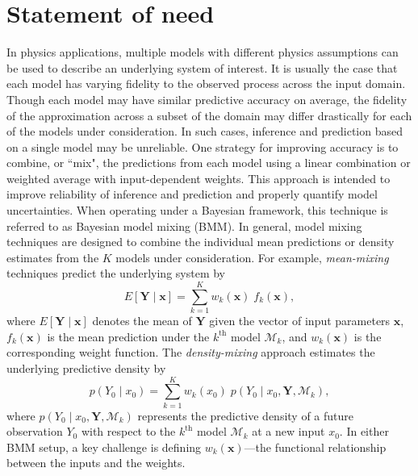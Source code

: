\documentclass[10pt, preprint,aps,prc,floatfix,
tightenlines,
nofootinbib,superscriptaddress]{revtex4-2}
\newcommand{\M}{\mathcal{M}}
\newcommand{\xvec}{\boldsymbol x}
\begin{document}
\section{Statement of need}

In physics applications, multiple models with different physics assumptions can be used to describe an underlying system of interest. It is usually the case that each model has varying fidelity to the observed process across the input domain. Though each model may have similar predictive accuracy on average, the fidelity of the approximation across a subset of the domain may differ drastically for each of the models under consideration. In such cases, inference and prediction based on a single model may be unreliable. One strategy for improving accuracy is to combine, or  ``mix", the predictions from each model using a linear combination or weighted average with input-dependent weights. This approach is intended to improve reliability of inference and prediction and properly quantify model uncertainties. When operating under a Bayesian framework, this technique is referred to as Bayesian model mixing (BMM). In general, model mixing techniques are designed to combine the individual mean predictions or density estimates from the $K$ models under consideration.
For example, \textit{mean-mixing} techniques predict the underlying system by 
\begin{equation}
    E[\bm Y \mid \xvec] = \sum_{k = 1}^K w_k(\xvec)\; f_k(\xvec),
\end{equation}
where $E[\bm Y\mid\xvec]$ denotes the mean of $\bm Y$ given the vector of input parameters $\bm x$, $f_k(\xvec)$ is the mean prediction under the $k^\mathrm{th}$ model $\mathcal{M}_k$, and $w_k(\xvec)$ is the corresponding weight function. The \textit{density-mixing} approach estimates the underlying predictive density by
\begin{equation}
    p(Y_{0} \mid x_{0}) = \sum_{k = 1}^K w_k(x_{0})\;p(Y_{0} \mid x_{0}, \bm{Y}, \M_k),
\end{equation}
where $p(Y_{0} \mid x_{0}, \bm{Y}, \M_k)$ represents the predictive density of a future observation $Y_{0}$ with respect to the $k^\mathrm{th}$ model $\mathcal{M}_k$ at a new input $x_{0}$. In either BMM setup, a key challenge is defining $w_k(\xvec)$---the functional relationship between the inputs and the weights. 
\end{document}
